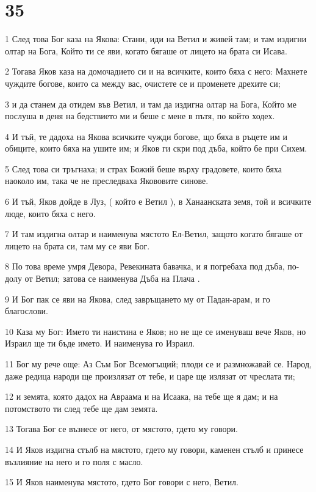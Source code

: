 \chapter{35}

\par 1 След това Бог каза на Якова: Стани, иди на Ветил и живей там; и там издигни олтар на Бога, Който ти се яви, когато бягаше от лицето на брата си Исава.
\par 2 Тогава Яков каза на домочадието си и на всичките, които бяха с него: Махнете чуждите богове, които са между вас, очистете се и променете дрехите си;
\par 3 и да станем да отидем във Ветил, и там да издигна олтар на Бога, Който ме послуша в деня на бедствието ми и беше с мене в пътя, по който ходех.
\par 4 И тъй, те дадоха на Якова всичките чужди богове, що бяха в ръцете им и обиците, които бяха на ушите им; и Яков ги скри под дъба, който бе при Сихем.
\par 5 След това си тръгнаха; и страх Божий беше върху градовете, които бяха наоколо им, така че не преследваха Якововите синове.
\par 6 И тъй, Яков дойде в Луз, ( който е Ветил ), в Ханаанската земя, той и всичките люде, които бяха с него.
\par 7 И там издигна олтар и наименува мястото Ел-Ветил, защото когато бягаше от лицето на брата си, там му се яви Бог.
\par 8 По това време умря Девора, Ревекината бавачка, и я погребаха под дъба, по-долу от Ветил; затова се наименува Дъба на Плача .
\par 9 И Бог пак се яви на Якова, след завръщането му от Падан-арам, и го благослови.
\par 10 Каза му Бог: Името ти наистина е Яков; но не ще се именуваш вече Яков, но Израил ще ти бъде името. И наименува го Израил.
\par 11 Бог му рече още: Аз Съм Бог Всемогъщий; плоди се и размножавай се. Народ, даже редица народи ще произлязат от тебе, и царе ще излязат от чреслата ти;
\par 12 и земята, която дадох на Авраама и на Исаака, на тебе ще я дам; и на потомството ти след тебе ще дам земята.
\par 13 Тогава Бог се възнесе от него, от мястото, гдето му говори.
\par 14 И Яков издигна стълб на мястото, гдето му говори, каменен стълб и принесе възлияние на него и го поля с масло.
\par 15 И Яков наименува мястото, гдето Бог говори с него, Ветил.
